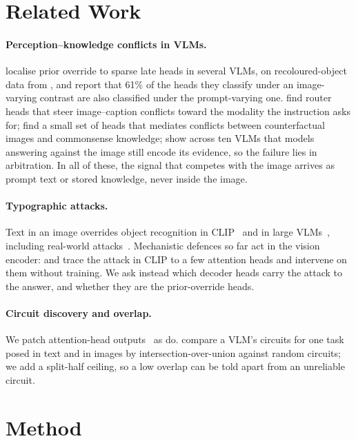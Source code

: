 \documentclass[letterpaper]{article}
\begin{document}
\section{Related Work}
\paragraph{Perception--knowledge conflicts in VLMs.}
\citet{lietzow2026} localise prior override to sparse late heads in several VLMs,
on recoloured-object data from \citet{golovanevsky2025counterfact}, and report
that 61\% of the heads they classify under an image-varying contrast are also
classified under the prompt-varying one. \citet{hua2025} find router heads that
steer image--caption conflicts toward the modality the instruction asks for;
\citet{ortu2025} find a small set of heads that mediates conflicts between
counterfactual images and commonsense knowledge; \citet{nooralahzadeh2026} show
across ten VLMs that models answering against the image still encode its
evidence, so the failure lies in arbitration. In all of these, the signal that
competes with the image arrives as prompt text or stored knowledge, never inside
the image.

\paragraph{Typographic attacks.}
Text in an image overrides object recognition in CLIP~\citep{goh2021multimodal}
and in large VLMs~\citep{cheng2024typodeceptions,qraitem2024selfgen}, including
real-world attacks~\citep{westerhoff2025scam}. Mechanistic defences so far act in
the vision encoder: \citet{dyslexify2025} and \citet{liu2026typographic} trace the
attack in CLIP to a few attention heads and intervene on them without training.
We ask instead which decoder heads carry the attack to the answer, and whether
they are the prior-override heads.

\paragraph{Circuit discovery and overlap.}
We patch attention-head outputs~\citep{meng2022rome,wang2023ioi,heimersheim2024patching}
as \citet{lietzow2026} do. \citet{nikankin2025} compare a VLM's circuits for one
task posed in text and in images by intersection-over-union against random
circuits; we add a split-half ceiling, so a low overlap can be told apart from an
unreliable circuit.

\section{Method}
\end{document}
